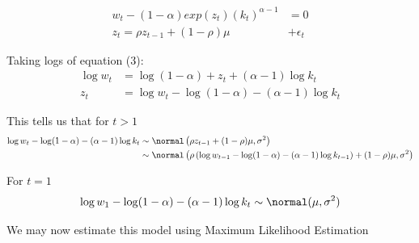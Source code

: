 \documentclass[12pt, letterpaper]{paper}
\begin{document}
\begin{align*}
  w_t - (1-\alpha) exp( z_t ) (k_t)^{\alpha-1} &= 0\\
  z_t = \rho z_{t-1} + (1-\rho)\mu &+ \epsilon_t
\end{align*}

Taking logs of equation (3):
\begin{align*}
  \log w_t &= \log ( 1- \alpha) + z_t + (\alpha-1) \log k_t\\
  z_t &= \log w_t - \log ( 1- \alpha) - (\alpha-1) \log k_t
\end{align*}

This tells us that for $t > 1$
\begin{align*}
  \log w_t - \log ( 1- \alpha) - (\alpha-1) \log k_t &\sim \normal\left( \rho z_{t-1} +
                                             (1-\rho)\mu, \sigma^2 \right)\\
  &\sim \normal\left( \rho\left( \log w_{t-1} - \log( 1- \alpha) -(\alpha-1) \log
    k_{t-1} \right) + (1-\rho)\mu, \sigma^2 \right)
\end{align*}

For $t=1$
\begin{equation*}
  \log w_1 - \log ( 1- \alpha) - (\alpha-1) \log k_t \sim \normal( \mu, \sigma^2)
\end{equation*}


We may now estimate this model using Maximum Likelihood Estimation
\end{document}

